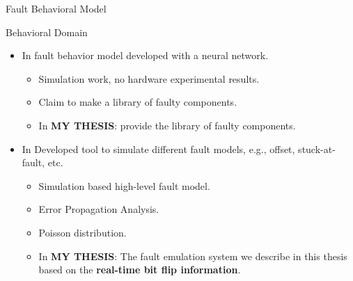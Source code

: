\documentclass[aspectratio=1610]{beamer}
\begin{document}
\begin{frame}{Fault Behavioral Model}

\begin{block}{Behavioral  Domain}
\end{block}
\begin{itemize}
\item In \citep{mirzadeh2014modeling} fault behavior model developed with a neural network.  
\begin{itemize}
\item Simulation work, no hardware experimental results.
\item Claim to make a library of faulty components.
\item In \textbf{MY THESIS}: provide the library of faulty components.

\end{itemize}



\item In \citep{janschek2017errorsim} Developed tool to simulate different fault models, e.g., offset, stuck-at-fault, etc.



\begin{itemize}


\item Simulation based high-level fault model.
\item Error Propagation Analysis.
\item Poisson distribution.

\item In \textbf{MY THESIS}: The fault emulation system we describe in this thesis based on the \textbf{real-time bit flip information}. 
\end{itemize} 
\end{itemize}







\end{frame}
\end{document}

